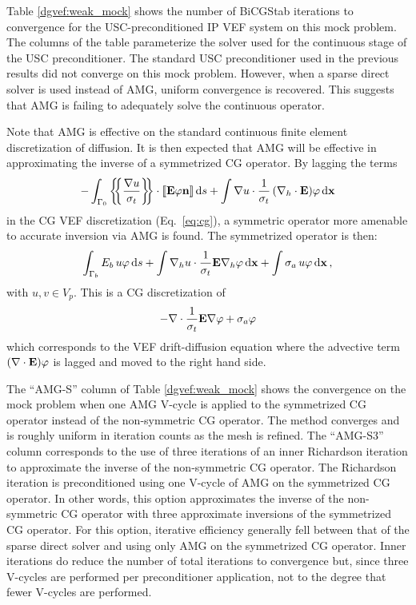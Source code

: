 \documentclass[../doc.tex]{subfiles}
\begin{document}
Table \ref{dgvef:weak_mock} shows the number of BiCGStab iterations to convergence for the USC-preconditioned IP VEF system on this mock problem. The columns of the table parameterize the solver used for the continuous stage of the USC preconditioner. The standard USC preconditioner used in the previous results did not converge on this mock problem. However, when a sparse direct solver is used instead of AMG, uniform convergence is recovered. This suggests that AMG is failing to adequately solve the continuous operator. 
\begin{table}
\centering
\caption{}
\label{dgvef:weak_mock}

\end{table}

Note that AMG is effective on the standard continuous finite element discretization of diffusion. It is then expected that AMG will be effective in approximating the inverse of a symmetrized CG operator. By lagging the terms 
	\begin{equation}
		-\int_{\Gamma_0} \left\{\!\!\left\{\frac{\nabla u}{\sigma_t}\right\}\!\!\right\}\cdot \left\llbracket\boldsymbol{\mathrm{E}}\varphi\boldsymbol{\mathrm{n}} \right\rrbracket \mathop{}\!\mathrm{d} s + \int \nabla u \cdot \frac{1}{\sigma_t} \left( \nabla_h\cdot\boldsymbol{\mathrm{E}} \right)\!\varphi \mathop{}\!\mathrm{d} \boldsymbol{\mathrm{x}}
	\end{equation}
in the CG VEF discretization (Eq.~\ref{eq:cg}), a symmetric operator more amenable to accurate inversion via AMG is found. The symmetrized operator is then:
	\begin{equation}
		\int_{\Gamma_b} E_b\, u \varphi \mathop{}\!\mathrm{d} s + \int \nabla_h u \cdot \frac{1}{\sigma_t}\boldsymbol{\mathrm{E}} \nabla_h \varphi \mathop{}\!\mathrm{d} \boldsymbol{\mathrm{x}} + \int \sigma_a\, u \varphi \mathop{}\!\mathrm{d} \boldsymbol{\mathrm{x}} \,, 
	\end{equation}
with $u,v \in V_p$. 
This is a CG discretization of 
	\begin{equation}
		-\nabla \cdot \frac{1}{\sigma_t}\boldsymbol{\mathrm{E}}\nabla \varphi + \sigma_a \varphi 
	\end{equation} 
which corresponds to the VEF drift-diffusion equation where the advective term $\left( \nabla\cdot\boldsymbol{\mathrm{E}} \right)\!\varphi$ is lagged and moved to the right hand side. 

The ``AMG-S'' column of Table \ref{dgvef:weak_mock} shows the convergence on the mock problem when one AMG V-cycle is applied to the symmetrized CG operator instead of the non-symmetric CG operator. The method converges and is roughly uniform in iteration counts as the mesh is refined. The ``AMG-S3'' column corresponds to the use of three iterations of an inner Richardson iteration to approximate the inverse of the non-symmetric CG operator. The Richardson iteration is preconditioned using one V-cycle of AMG on the symmetrized CG operator. In other words, this option approximates the inverse of the non-symmetric CG operator with three approximate inversions of the symmetrized CG operator. For this option, iterative efficiency generally fell between that of the sparse direct solver and using only AMG on the symmetrized CG operator. Inner iterations do reduce the number of total iterations to convergence but, since three V-cycles are performed per preconditioner application, not to the degree that fewer V-cycles are performed.
\end{document}
